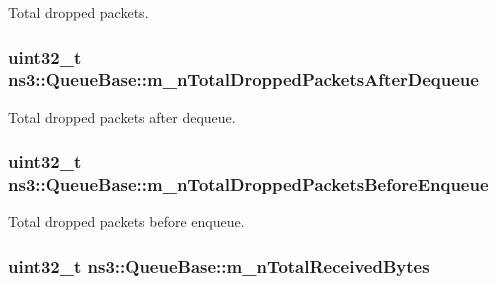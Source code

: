 Total dropped packets. 

\subsubsection[{\texorpdfstring{m\+\_\+n\+Total\+Dropped\+Packets\+After\+Dequeue}{m_nTotalDroppedPacketsAfterDequeue}}]{\setlength{\rightskip}{0pt plus 5cm}uint32\+\_\+t ns3\+::\+Queue\+Base\+::m\+\_\+n\+Total\+Dropped\+Packets\+After\+Dequeue\hspace{0.3cm}{\ttfamily [private]}}\hypertarget{classns3_1_1QueueBase_a341138319f0891e67670f471723898b2}{}\label{classns3_1_1QueueBase_a341138319f0891e67670f471723898b2}


Total dropped packets after dequeue. 

\subsubsection[{\texorpdfstring{m\+\_\+n\+Total\+Dropped\+Packets\+Before\+Enqueue}{m_nTotalDroppedPacketsBeforeEnqueue}}]{\setlength{\rightskip}{0pt plus 5cm}uint32\+\_\+t ns3\+::\+Queue\+Base\+::m\+\_\+n\+Total\+Dropped\+Packets\+Before\+Enqueue\hspace{0.3cm}{\ttfamily [private]}}\hypertarget{classns3_1_1QueueBase_a91c2cfb7155257d8b35a51b42bda697a}{}\label{classns3_1_1QueueBase_a91c2cfb7155257d8b35a51b42bda697a}


Total dropped packets before enqueue. 

\subsubsection[{\texorpdfstring{m\+\_\+n\+Total\+Received\+Bytes}{m_nTotalReceivedBytes}}]{\setlength{\rightskip}{0pt plus 5cm}uint32\+\_\+t ns3\+::\+Queue\+Base\+::m\+\_\+n\+Total\+Received\+Bytes\hspace{0.3cm}{\ttfamily [private]}}\hypertarget{classns3_1_1QueueBase_ad4407ad7faaf49e1e1e78395bdf875aa}{}\label{classns3_1_1QueueBase_ad4407ad7faaf49e1e1e78395bdf875aa}


